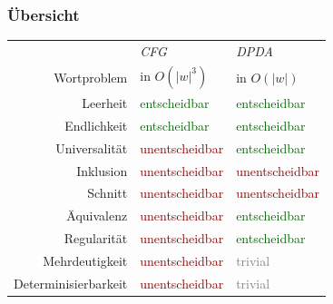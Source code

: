 \documentclass[onlymath]{beamer}
\begin{document}
\begin{frame}\frametitle{Übersicht}

\begin{tabular}{rll}
 & \emph{CFG} & \emph{DPDA}\\
Wortproblem
	& in $O(|w|^3)$
	& in $O(|w|)$\\[1ex]
Leerheit 
	& \textcolor{darkgreen}{entscheidbar}
	& \textcolor{darkgreen}{entscheidbar}\\
Endlichkeit
	& \textcolor{darkgreen}{entscheidbar}
	& \textcolor{darkgreen}{entscheidbar}\\
Universalität
	& \textcolor{darkred}{unentscheidbar}
	& \textcolor{darkgreen}{entscheidbar}\\[1ex]
Inklusion
	& \textcolor{darkred}{unentscheidbar}
	& \textcolor{darkred}{unentscheidbar}\\
Schnitt
	& \textcolor{darkred}{unentscheidbar}
	& \textcolor{darkred}{unentscheidbar}\\
Äquivalenz
	& \textcolor{darkred}{unentscheidbar}
	& \textcolor{darkgreen}{entscheidbar}\\[1ex]
Regularität
	& \textcolor{darkred}{unentscheidbar}
	& \textcolor{darkgreen}{entscheidbar}\\
Mehrdeutigkeit
	& \textcolor{darkred}{unentscheidbar}
	& \textcolor{gray}{trivial}\\
Determinisierbarkeit 
	& \textcolor{darkred}{unentscheidbar}
	& \textcolor{gray}{trivial}\\
\end{tabular}

\end{frame}

\end{document}

